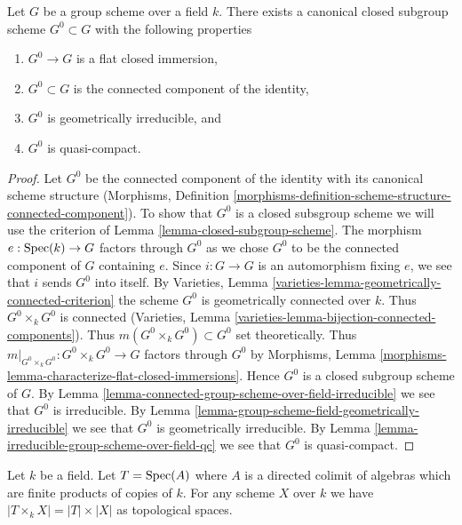 \begin{proposition}
\label{proposition-connected-component}
Let $G$ be a group scheme over a field $k$. There exists a canonical closed
subgroup scheme $G^0 \subset G$ with the following properties
\begin{enumerate}
\item $G^0 \to G$ is a flat closed immersion,
\item $G^0 \subset G$ is the connected component of the identity,
\item $G^0$ is geometrically irreducible, and
\item $G^0$ is quasi-compact.
\end{enumerate}
\end{proposition}

\begin{proof}
Let $G^0$ be the connected component of the identity with its canonical
scheme structure (Morphisms, Definition
\ref{morphisms-definition-scheme-structure-connected-component}).
To show that $G^0$ is a closed subsgroup scheme we will use the
criterion of Lemma \ref{lemma-closed-subgroup-scheme}.
The morphism $e : \mathop{\mathrm{Spec}}(k) \to G$ factors through $G^0$ as we chose
$G^0$ to be the connected component of $G$ containing $e$.
Since $i : G \to G$ is an automorphism fixing $e$, we see that
$i$ sends $G^0$ into itself.
By Varieties, Lemma \ref{varieties-lemma-geometrically-connected-criterion}
the scheme $G^0$ is geometrically connected over $k$.
Thus $G^0 \times_k G^0$ is connected
(Varieties, Lemma \ref{varieties-lemma-bijection-connected-components}).
Thus $m(G^0 \times_k G^0) \subset G^0$ set theoretically.
Thus $m|_{G^0 \times_k G^0} : G^0 \times_k G^0 \to G$
factors through $G^0$ by
Morphisms, Lemma \ref{morphisms-lemma-characterize-flat-closed-immersions}.
Hence $G^0$ is a closed subgroup scheme of $G$.
By Lemma \ref{lemma-connected-group-scheme-over-field-irreducible}
we see that $G^0$ is irreducible. By
Lemma \ref{lemma-group-scheme-field-geometrically-irreducible}
we see that $G^0$ is geometrically irreducible. By
Lemma \ref{lemma-irreducible-group-scheme-over-field-qc}
we see that $G^0$ is quasi-compact.
\end{proof}

\begin{lemma}
\label{lemma-profinite-product-over-field}
Let $k$ be a field. Let $T = \mathop{\mathrm{Spec}}(A)$ where $A$ is a directed colimit of
algebras which are finite products of copies of $k$. For any scheme $X$
over $k$ we have $|T \times_k X| = |T| \times |X|$ as topological spaces.
\end{lemma}

